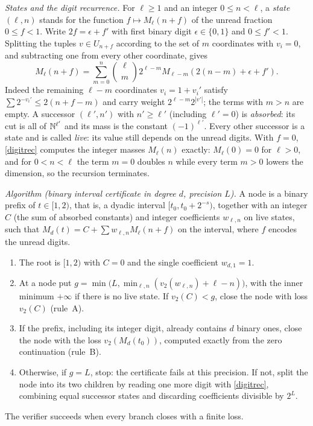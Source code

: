 \documentclass[11pt]{article}
\begin{document}
\emph{States and the digit recurrence.} For \(\ell\ge1\) and an integer
\(0\le n<\ell\), a \emph{state} \((\ell,n)\) stands for the function
\(f\mapsto M_\ell(n+f)\) of the unread fraction \(0\le f<1\). Write
\(2f=\epsilon+f'\) with first binary digit \(\epsilon\in\{0,1\}\) and
\(0\le f'<1\). Splitting the tuples \(v\in U_{n+f}\) according to the set
of \(m\) coordinates with \(v_i=0\), and subtracting one from every other
coordinate, gives
\begin{equation}\label{digitrec}
 M_\ell(n+f)=\sum_{m=0}^n \binom{\ell}{m}2^{\ell-m}
                  M_{\ell-m}(2(n-m)+\epsilon+f').
\end{equation}
Indeed the remaining \(\ell-m\) coordinates \(v_i=1+v_i'\) satisfy
\(\sum 2^{-v_i'}\le2(n+f-m)\) and carry weight \(2^{\ell-m}2^{|v'|}\); the
terms with \(m>n\) are empty. A successor \((\ell',n')\) with
\(n'\ge\ell'\) (including \(\ell'=0\)) is \emph{absorbed}: its cut is all of
\(\mathbb N^{\ell'}\) and its mass is the constant \((-1)^{\ell'}\). Every other
successor is a state and is called \emph{live}: its value still depends
on the unread digits. With \(f=0\), \eqref{digitrec} computes the integer
masses \(M_\ell(n)\) exactly: \(M_\ell(0)=0\) for \(\ell>0\), and for
\(0<n<\ell\) the term \(m=0\) doubles \(n\) while every term \(m>0\)
lowers the dimension, so the recursion terminates.

\emph{Algorithm (binary interval certificate in degree \(d\), precision
\(L\)).} A node is a binary prefix of \(t\in[1,2)\), that is, a dyadic
interval \([t_0,t_0+2^{-s})\), together with an integer \(C\) (the sum of
absorbed constants) and integer coefficients \(w_{\ell,n}\) on live states,
such that \(M_d(t)=C+\sum w_{\ell,n}M_\ell(n+f)\) on the interval, where
\(f\) encodes the unread digits.
\begin{enumerate}
\item The root is \([1,2)\) with \(C=0\) and the single coefficient
\(w_{d,1}=1\).
\item At a node put \(g=\min\bigl(L,\min_{\ell,n}(v_2(w_{\ell,n})+\ell-n)\bigr)\),
with the inner minimum \(+\infty\) if there is no live state. If
\(v_2(C)<g\), close the node with loss \(v_2(C)\) (rule~A).
\item If the prefix, including its integer digit, already contains \(d\)
binary ones, close the node with the loss \(v_2(M_d(t_0))\), computed
exactly from the zero continuation (rule~B).
\item Otherwise, if \(g=L\), stop: the certificate fails at this
precision. If not, split the node into its two children by reading one
more digit with \eqref{digitrec}, combining equal successor states and
discarding coefficients divisible by \(2^L\).
\end{enumerate}
The verifier succeeds when every branch closes with a finite loss.
\end{document}
